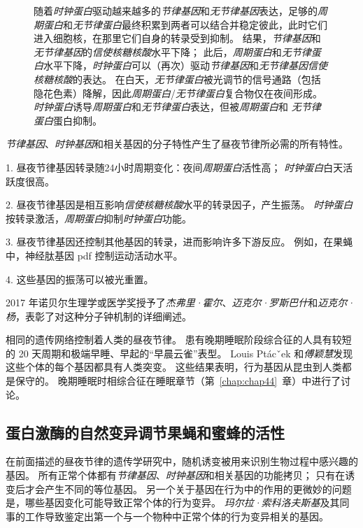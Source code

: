 \begin{figure}[htbp]
{		随着\textit{时钟蛋白}驱动越来越多的\textit{节律基因}和\textit{无节律基因}表达，足够的\textit{周期蛋白}和\textit{无节律蛋白}最终积累到两者可以结合并稳定彼此，此时它们进入细胞核，在那里它们自身的转录受到抑制。
		结果，\textit{节律基因}和\textit{无节律基因}的\textit{信使核糖核酸}水平下降； 此后，\textit{周期蛋白}和\textit{无节律蛋白}水平下降，\textit{时钟蛋白}可以（再次）驱动\textit{节律基因}和\textit{无节律基因}\textit{信使核糖核酸}的表达。
		在白天，\textit{无节律蛋白}被光调节的信号通路（包括隐花色素）降解，因此\textit{周期蛋白}/\textit{无节律蛋白}复合物仅在夜间形成。
		\textit{时钟蛋白}诱导\textit{周期蛋白}和\textit{无节律蛋白}表达，但被\textit{周期蛋白}和 \textit{无节律蛋白}蛋白抑制。}
	\label{fig:2_13}
\end{figure}


\textit{节律基因}、\textit{时钟基因}和相关基因的分子特性产生了昼夜节律所必需的所有特性。

1. 昼夜节律基因转录随24小时周期变化：夜间\textit{周期蛋白}活性高；
\textit{时钟蛋白}白天活跃度很高。


2. 昼夜节律基因是相互影响\textit{信使核糖核酸}水平的转录因子，产生振荡。
\textit{时钟蛋白}按转录激活，\textit{周期蛋白}抑制\textit{时钟蛋白}功能。


3. 昼夜节律基因还控制其他基因的转录，进而影响许多下游反应。
例如，在果蝇中，神经肽基因 pdf 控制运动活动水平。


4. 这些基因的振荡可以被光重置。


2017 年诺贝尔生理学或医学奖授予了\textit{杰弗里·霍尔}、\textit{迈克尔·罗斯巴什}和\textit{迈克尔·杨}，表彰了对这种分子钟机制的详细阐述。


相同的遗传网络控制着人类的昼夜节律。
患有晚期睡眠阶段综合征的人具有较短的 20 天周期和极端早睡、早起的“早晨云雀”表型。
Louis Ptácˇek 和\textit{傅颖慧}发现这些个体的每个基因都具有人类突变。
这些结果表明，行为基因从昆虫到人类都是保守的。 
晚期睡眠时相综合征在睡眠章节（第~\ref{chap:chap44}~章）中进行了讨论。



\subsection{蛋白激酶的自然变异调节果蝇和蜜蜂的活性}

在前面描述的昼夜节律的遗传学研究中，随机诱变被用来识别生物过程中感兴趣的基因。
所有正常个体都有\textit{节律基因}、\textit{时钟基因}和相关基因的功能拷贝；
只有在诱变后才会产生不同的等位基因。
另一个关于基因在行为中的作用的更微妙的问题是，哪些基因变化可能导致正常个体的行为变异。
\textit{玛尔拉·索科洛夫斯基}及其同事的工作导致鉴定出第一个与一个物种中正常个体的行为变异相关的基因。


